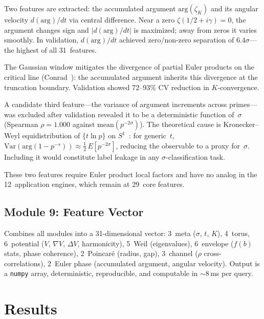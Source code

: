 \documentclass[11pt]{amsart}
\begin{document}
Two features are extracted: the accumulated argument $\mathrm{arg}(\zeta_K)$
and its angular velocity $d(\mathrm{arg})/dt$ via central difference.  Near
a zero $\zeta(1/2+i\gamma)=0$, the argument changes sign and
$|d(\mathrm{arg})/dt|$ is maximized; away from zeros it varies smoothly.
In validation, $d(\mathrm{arg})/dt$ achieved zero/non-zero separation of
$6.4\sigma$---the highest of all 31~features.

The Gaussian window mitigates the divergence of partial Euler products on the
critical line (Conrad~\cite{Conrad2005}): the accumulated argument inherits
this divergence at the truncation boundary.  Validation showed 72--93\% CV
reduction in $K$-convergence.

A candidate third feature---the variance of argument increments across
primes---was excluded after validation revealed it to be a deterministic
function of~$\sigma$ (Spearman $\rho = 1.000$ against
$\mathrm{mean}(p^{-2\sigma})$).  The theoretical cause is Kronecker--Weyl
equidistribution of $\{t\ln p\}$ on $S^1$~\cite{CriticalCircle}: for generic~$t$,
$\mathrm{Var}(\mathrm{arg}(1-p^{-s})) \approx \tfrac{1}{2}\,E[p^{-2\sigma}]$,
reducing the observable to a proxy for~$\sigma$.  Including it would
constitute label leakage in any $\sigma$-classification task.

These two features require Euler product local factors and have no analog in
the 12~application engines, which remain at 29~core features.

\subsection{Module 9: Feature Vector}

Combines all modules into a 31-dimensional vector: 3~meta ($\sigma$, $t$,
$K$), 4~torus, 6~potential ($V$, $\nabla V$, $\Delta V$, harmonicity),
5~Weil (eigenvalues), 6~envelope ($f(b)$ stats, phase coherence),
2~Poincar\'e (radius, gap), 3~channel ($\rho$ cross-correlations),
2~Euler phase (accumulated argument, angular velocity). Output is
a \texttt{numpy} array, deterministic, reproducible, and computable in
${\sim}8\,$ms per query.


\section{Results}
\label{sec:results}
\end{document}
